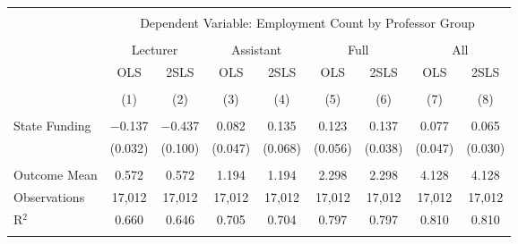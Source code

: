 
\begin{tabular}{@{\extracolsep{5pt}}lcccccccc} 
\\[-1.8ex]\hline 
\hline \\[-1.8ex] 
 & \multicolumn{8}{c}{Dependent Variable: Employment Count by Professor Group} \\ 
\cline{2-9} 
\\[-1.8ex] & \multicolumn{2}{c}{Lecturer} & \multicolumn{2}{c}{Assistant} & \multicolumn{2}{c}{Full} & \multicolumn{2}{c}{All} \\ 
 & OLS & 2SLS & OLS & 2SLS & OLS & 2SLS & OLS & 2SLS \\ 
\\[-1.8ex] & (1) & (2) & (3) & (4) & (5) & (6) & (7) & (8)\\ 
\hline \\[-1.8ex] 
 State Funding & $-$0.137 & $-$0.437 & 0.082 & 0.135 & 0.123 & 0.137 & 0.077 & 0.065 \\ 
  & (0.032) & (0.100) & (0.047) & (0.068) & (0.056) & (0.038) & (0.047) & (0.030) \\ 
 \hline \\[-1.8ex] 
Outcome Mean & 0.572 & 0.572 & 1.194 & 1.194 & 2.298 & 2.298 & 4.128 & 4.128 \\ 
Observations & 17,012 & 17,012 & 17,012 & 17,012 & 17,012 & 17,012 & 17,012 & 17,012 \\ 
R$^{2}$ & 0.660 & 0.646 & 0.705 & 0.704 & 0.797 & 0.797 & 0.810 & 0.810 \\ 
\hline 
\hline \\[-1.8ex] 
\end{tabular} 
